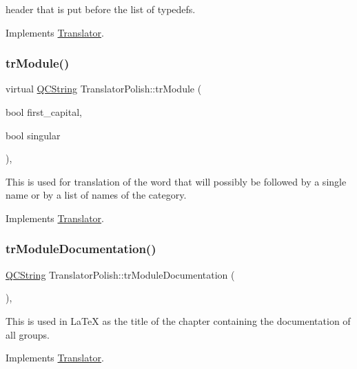 header that is put before the list of typedefs. 

Implements \mbox{\hyperlink{class_translator}{Translator}}.

\mbox{\label{class_translator_polish_af3a66c1f9b4c098eea416acc70878266}} 
\subsubsection{\texorpdfstring{trModule()}{trModule()}}
{\footnotesize\ttfamily virtual \mbox{\hyperlink{class_q_c_string}{Q\+C\+String}} Translator\+Polish\+::tr\+Module (\begin{DoxyParamCaption}\item[{bool}]{first\+\_\+capital,  }\item[{bool}]{singular }\end{DoxyParamCaption})\hspace{0.3cm}{\ttfamily [inline]}, {\ttfamily [virtual]}}

This is used for translation of the word that will possibly be followed by a single name or by a list of names of the category. 

Implements \mbox{\hyperlink{class_translator}{Translator}}.

\mbox{\label{class_translator_polish_a157f3cda12be17ee13f61cc904c4dfd2}} 
\subsubsection{\texorpdfstring{trModuleDocumentation()}{trModuleDocumentation()}}
{\footnotesize\ttfamily \mbox{\hyperlink{class_q_c_string}{Q\+C\+String}} Translator\+Polish\+::tr\+Module\+Documentation (\begin{DoxyParamCaption}{ }\end{DoxyParamCaption})\hspace{0.3cm}{\ttfamily [inline]}, {\ttfamily [virtual]}}

This is used in La\+TeX as the title of the chapter containing the documentation of all groups. 

Implements \mbox{\hyperlink{class_translator}{Translator}}.

